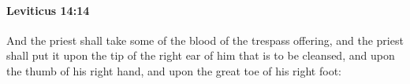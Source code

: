 
		\paragraph{Leviticus 14:14} %
			\label{LEVITICUS-14-14}

			And the priest shall take some of the blood of the trespass offering, and the priest shall put it upon the tip of the right ear of him that is to be cleansed, and upon the thumb of his right hand, and upon the great toe of his right foot:


